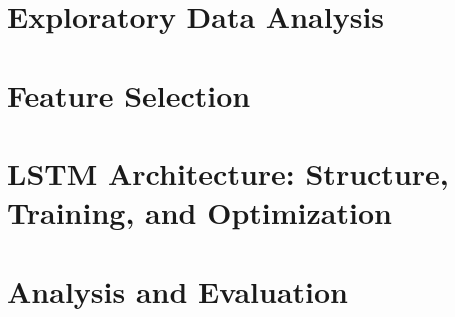 \documentclass[12pt,a4paper,bibliography=totocnumbered,listof=totocnumbered]{article}
\begin{document}
\pagebreak
\section{Exploratory Data Analysis}




\pagebreak
\section{Feature Selection}
\label{sec:feature_selection}




\pagebreak
\section{LSTM Architecture: Structure, Training, and Optimization}



\pagebreak

\section{Analysis and Evaluation}



\end{document}
